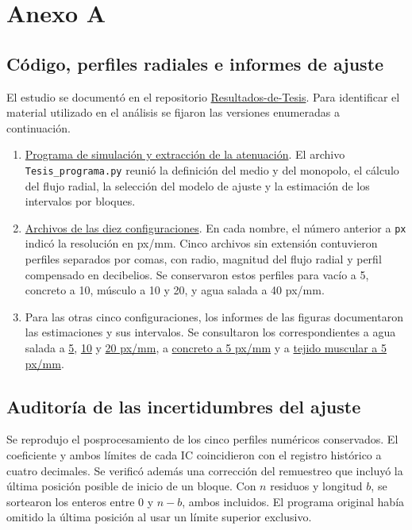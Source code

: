 \chapter{Anexo A}\renewcommand{\tablename}{Cuadro}\label{an:fdtd-fuentes}
\section{Código, perfiles radiales e informes de ajuste}
El estudio se documentó en el repositorio \href{https://github.com/JavierMencos/Resultados-de-Tesis}{Resultados-de-Tesis}. Para identificar el material utilizado en el análisis se fijaron las versiones enumeradas a continuación.
\begin{enumerate}
\item \href{https://github.com/JavierMencos/Resultados-de-Tesis/blob/0dc64c175678ffb762755169c651f998836e8f8a/Tesis_programa.py}{Programa de simulación y extracción de la atenuación}. El archivo \texttt{Tesis\_programa.py} reunió la definición del medio y del monopolo, el cálculo del flujo radial, la selección del modelo de ajuste y la estimación de los intervalos por bloques.
\item \href{https://github.com/JavierMencos/Resultados-de-Tesis/tree/e96d8776842d98bcb3e97faac9887df156888eac/Tesis_Resultados}{Archivos de las diez configuraciones}. En cada nombre, el número anterior a \texttt{px} indicó la resolución en px/mm. Cinco archivos sin extensión contuvieron perfiles separados por comas, con radio, magnitud del flujo radial y perfil compensado en decibelios. Se conservaron estos perfiles para vacío a 5, concreto a 10, músculo a 10 y 20, y agua salada a 40 px/mm.
\item Para las otras cinco configuraciones, los informes de las figuras documentaron las estimaciones y sus intervalos. Se consultaron los correspondientes a agua salada a \href{https://github.com/JavierMencos/Resultados-de-Tesis/commit/823defa}{5}, \href{https://github.com/JavierMencos/Resultados-de-Tesis/commit/adbe296}{10} y \href{https://github.com/JavierMencos/Resultados-de-Tesis/commit/100e2a0}{20 px/mm}, a \href{https://github.com/JavierMencos/Resultados-de-Tesis/commit/209d7d6}{concreto a 5 px/mm} y a \href{https://github.com/JavierMencos/Resultados-de-Tesis/commit/e96d877}{tejido muscular a 5 px/mm}.
\end{enumerate}

\section{Auditoría de las incertidumbres del ajuste}
Se reprodujo el posprocesamiento de los cinco perfiles numéricos conservados. El coeficiente y ambos límites de cada IC coincidieron con el registro histórico a cuatro decimales. Se verificó además una corrección del remuestreo que incluyó la última posición posible de inicio de un bloque. Con $n$ residuos y longitud $b$, se sortearon los enteros entre 0 y $n-b$, ambos incluidos. El programa original había omitido la última posición al usar un límite superior exclusivo.

